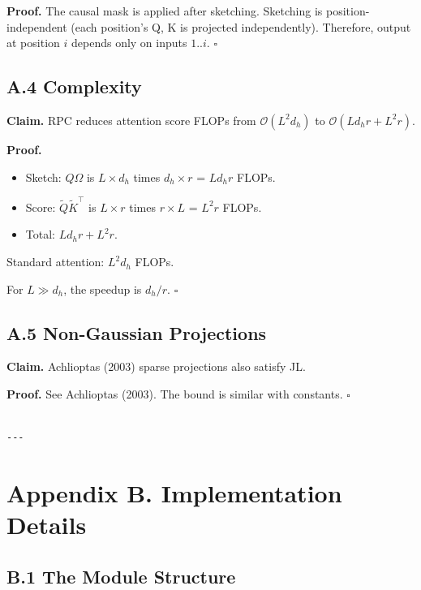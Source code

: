 \textbf{Proof.} The causal mask is applied after sketching. Sketching is 
position-independent (each position's Q, K is projected independently). 
Therefore, output at position $i$ depends only on inputs $1..i$. $\square$

\subsection{A.4 Complexity}

\textbf{Claim.} RPC reduces attention score FLOPs from $\mathcal{O}(L^2 d_h)$ 
to $\mathcal{O}(L d_h r + L^2 r)$.

\textbf{Proof.}
\begin{itemize}
\item Sketch: $Q \Omega$ is $L \times d_h$ times $d_h \times r$ = $L d_h r$ FLOPs.
\item Score: $\tilde{Q} \tilde{K}^\top$ is $L \times r$ times $r \times L$ = $L^2 r$ FLOPs.
\item Total: $L d_h r + L^2 r$.

\end{itemize}
Standard attention: $L^2 d_h$ FLOPs.

For $L \gg d_h$, the speedup is $d_h / r$. $\square$

\subsection{A.5 Non-Gaussian Projections}

\textbf{Claim.} Achlioptas (2003) sparse projections also satisfy JL.

\textbf{Proof.} See Achlioptas (2003). The bound is similar with constants. $\square$
\begin{lstlisting}

---
\end{lstlisting}


\section{Appendix B. Implementation Details}

\subsection{B.1 The Module Structure}

